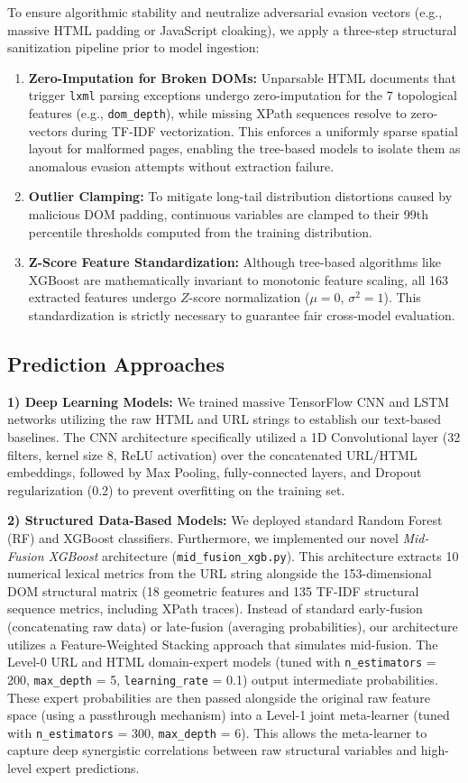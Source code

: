 \documentclass[conference]{IEEEtran}
\begin{document}
To ensure algorithmic stability and neutralize adversarial evasion vectors (e.g., massive HTML padding or JavaScript cloaking), we apply a three-step structural sanitization pipeline prior to model ingestion:
\begin{enumerate}
    \item \textbf{Zero-Imputation for Broken DOMs:} Unparsable HTML documents that trigger \texttt{lxml} parsing exceptions undergo zero-imputation for the 7 topological features (e.g., \texttt{dom\_depth}), while missing XPath sequences resolve to zero-vectors during TF-IDF vectorization. This enforces a uniformly sparse spatial layout for malformed pages, enabling the tree-based models to isolate them as anomalous evasion attempts without extraction failure.
    \item \textbf{Outlier Clamping:} To mitigate long-tail distribution distortions caused by malicious DOM padding, continuous variables are clamped to their 99th percentile thresholds computed from the training distribution.
    \item \textbf{Z-Score Feature Standardization:} Although tree-based algorithms like XGBoost are mathematically invariant to monotonic feature scaling, all 163 extracted features undergo $Z$-score normalization ($\mu=0$, $\sigma^2=1$). This standardization is strictly necessary to guarantee fair cross-model evaluation.
\end{enumerate}

\subsection{Prediction Approaches}
\textbf{1) Deep Learning Models:} We trained massive TensorFlow CNN and LSTM networks utilizing the raw HTML and URL strings to establish our text-based baselines. The CNN architecture specifically utilized a 1D Convolutional layer (32 filters, kernel size 8, ReLU activation) over the concatenated URL/HTML embeddings, followed by Max Pooling, fully-connected layers, and Dropout regularization (0.2) to prevent overfitting on the training set.

\textbf{2) Structured Data-Based Models:} We deployed standard Random Forest (RF) and XGBoost classifiers. Furthermore, we implemented our novel \textit{Mid-Fusion XGBoost} architecture (\texttt{mid\_fusion\_xgb.py}). This architecture extracts 10 numerical lexical metrics from the URL string alongside the 153-dimensional DOM structural matrix (18 geometric features and 135 TF-IDF structural sequence metrics, including XPath traces). Instead of standard early-fusion (concatenating raw data) or late-fusion (averaging probabilities), our architecture utilizes a Feature-Weighted Stacking approach that simulates mid-fusion. The Level-0 URL and HTML domain-expert models (tuned with \texttt{n\_estimators} = 200, \texttt{max\_depth} = 5, \texttt{learning\_rate} = 0.1) output intermediate probabilities. These expert probabilities are then passed alongside the original raw feature space (using a passthrough mechanism) into a Level-1 joint meta-learner (tuned with \texttt{n\_estimators} = 300, \texttt{max\_depth} = 6). This allows the meta-learner to capture deep synergistic correlations between raw structural variables and high-level expert predictions.
\end{document}

